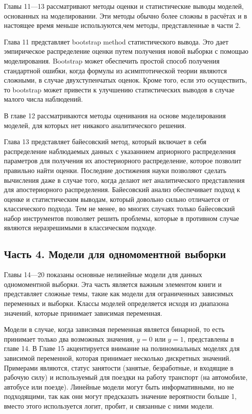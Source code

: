 	Главы 11---13 рассматривают методы оценки и статистические выводы моделей, основанных на моделировании. Эти методы обычно более сложны в расчётах и в настоящее время меньше используются,чем методы, представленные в части 2.
	
	
	Глава 11 представляет bootstrap method статистического вывода. Это дает эмпирическое распределение оценки путем получения новой выборки с помощью моделирования. Bootstrap может обеспечить простой способ получения стандартной ошибки, когда формулы из асимптотической теории являются сложными, в случае двухступенчатых оценок. Кроме того, если это осуществить, то bootstrap может привести к улучшению статистических выводов в случае малого числа наблюдений.
	
	
	В главе 12 рассматриваются методы оценивания на основе моделирования моделей, для которых нет никакого аналитического решения. 
	
	
	Глава 13 представляет байесовский метод, который включает в себя распределение наблюдаемых данных с указаннием априорного распределения параметров для получения их апостериорного распределение, которое позволит правильно найти оценки. Последние достижения науки позволяют сделать вычисления даже в случае того, когда  делают нет аналитического представления для апостериорного распределения. Байесовский анализ обеспечивает подход к оценке и статистическим выводам, который довольно сильно отличается от классического подхода. Тем не менее, во многих случаях только байесовский набор инструментов позволяет решить проблемы, которые в противном случае являются неразрешимыми в классическом подходе.

\subsection{Часть 4. Модели для одномоментной выборки}

	Главы 14---20 показаны основные нелинейные модели для данных одномоментной выборки. Эта часть является важным элементом книги и представляет сложные темы, такие как модели для ограниченных зависимых переменных и выборки. Классы моделей определяется исходя из диапазона значений, которые принимает зависимая переменная.
	
	
	Модели в случае, когда зависимая переменная является бинарной, то есть принимает только два возможных значения, $y = 0$ или $y = 1$, представлены в главе 14. В Главе 15 акцентируется внимание на полиномиальных моделях для зависимой переменной, которая принимает несколько дискретных значений. Примерами являются, статус занятости (занятые, безработные, и входящие в рабочую силу) и используемый для поездки на работу транспорт (на автомобиле, автобусе или поезде). Линейные модели могут быть информативными, но не подходящими, так как они могут предсказать значение вероятности больше 1, вместо этого используется логит, пробит, и связанные с ними модели.
	
